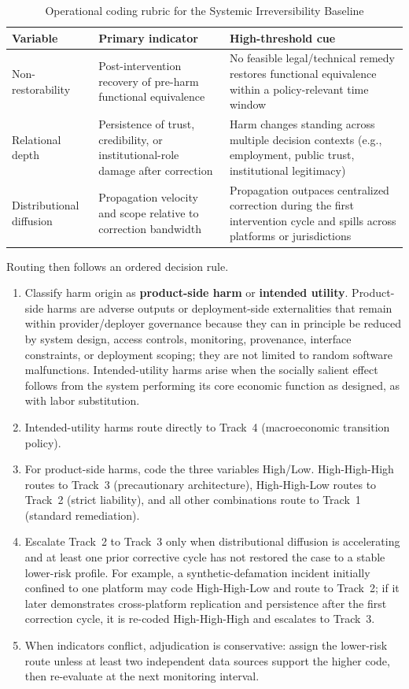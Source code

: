 \documentclass[11pt]{article}
\begin{document}
\begin{table}[H]
  \centering
  \small
  \caption{Operational coding rubric for the Systemic Irreversibility Baseline}
  \label{tab:baseline-rubric}
  \begin{tabular}{p{2.8cm}p{5.0cm}p{5.3cm}}
    \toprule
    Variable & Primary indicator & High-threshold cue \\
    \midrule
    Non-restorability & Post-intervention recovery of pre-harm functional equivalence & No feasible legal/technical remedy restores functional equivalence within a policy-relevant time window \\
    Relational depth & Persistence of trust, credibility, or institutional-role damage after correction & Harm changes standing across multiple decision contexts (e.g., employment, public trust, institutional legitimacy) \\
    Distributional diffusion & Propagation velocity and scope relative to correction bandwidth & Propagation outpaces centralized correction during the first intervention cycle and spills across platforms or jurisdictions \\
    \bottomrule
  \end{tabular}
\end{table}

Routing then follows an ordered decision rule.
\begin{enumerate}
  \item Classify harm origin as \textbf{product-side harm} or \textbf{intended utility}. Product-side harms are adverse outputs or deployment-side externalities that remain within provider/deployer governance because they can in principle be reduced by system design, access controls, monitoring, provenance, interface constraints, or deployment scoping; they are not limited to random software malfunctions. Intended-utility harms arise when the socially salient effect follows from the system performing its core economic function as designed, as with labor substitution.
  \item Intended-utility harms route directly to Track~4 (macroeconomic transition policy).
  \item For product-side harms, code the three variables High/Low. High-High-High routes to Track~3 (precautionary architecture), High-High-Low routes to Track~2 (strict liability), and all other combinations route to Track~1 (standard remediation).
  \item Escalate Track~2 to Track~3 only when distributional diffusion is accelerating and at least one prior corrective cycle has not restored the case to a stable lower-risk profile. For example, a synthetic-defamation incident initially confined to one platform may code High-High-Low and route to Track~2; if it later demonstrates cross-platform replication and persistence after the first correction cycle, it is re-coded High-High-High and escalates to Track~3.
  \item When indicators conflict, adjudication is conservative: assign the lower-risk route unless at least two independent data sources support the higher code, then re-evaluate at the next monitoring interval.
\end{enumerate}
\end{document}
